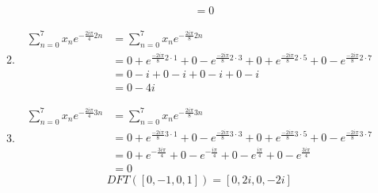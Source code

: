 \documentclass{article}
\begin{document}
\begin{enumerate}[label=\Alph*)]
\begin{enumerate}[label={k=\arabic*}, start=0]
\begin{align*}
                                                                     & = 0
                    \end{align*}
              \item \begin{align*}
                        \sum_{n=0}^{7}{x_n e^{-\frac{2 i \pi}{4}2n}} & = \sum_{n=0}^{7}{x_n e^{-\frac{2 i \pi}{8}2n}}                                                                                                              \\
                                                                     & = 0 + e^{\frac{-2 i \pi}{8} 2 \cdot 1} + 0 - e^{\frac{-2 i \pi}{8} 2 \cdot 3} + 0 + e^{\frac{-2 i \pi}{8} 2 \cdot 5} + 0 - e^{\frac{-2 i \pi}{8} 2 \cdot 7} \\
                                                                     & = 0 - i + 0 - i + 0 - i + 0 - i                                                                                                                             \\
                                                                     & = 0 - 4i
                    \end{align*}
              \item \begin{align*}
                        \sum_{n=0}^{7}{x_n e^{-\frac{2 i \pi}{4}3n}} & = \sum_{n=0}^{7}{x_n e^{-\frac{2 i \pi}{8}3n}}                                                                                                              \\
                                                                     & = 0 + e^{\frac{-2 i \pi}{8} 3 \cdot 1} + 0 - e^{\frac{-2 i \pi}{8} 3 \cdot 3} + 0 + e^{\frac{-2 i \pi}{8} 3 \cdot 5} + 0 - e^{\frac{-2 i \pi}{8} 3 \cdot 7} \\
                                                                     & = 0 + e^{-\frac{3 i \pi}{4}} + 0 - e^{-\frac{i \pi}{4}} + 0 - e^{\frac{i \pi}{4}} + 0 - e^{\frac{3 i \pi}{4}}                                               \\
                                                                     & = 0
                    \end{align*}
                    \begin{equation*}
                        DFT([0, -1, 0, 1]) = [0, 2i, 0, -2i]
                    \end{equation*}
          \end{enumerate}
\end{enumerate}
\end{document}

